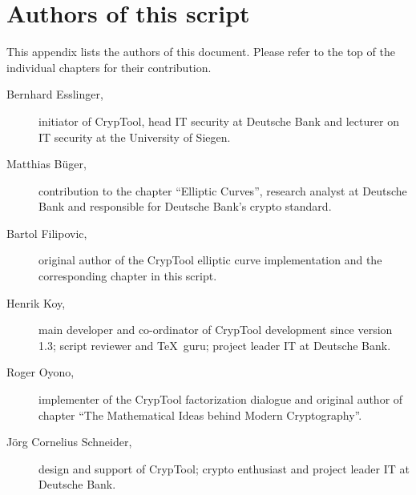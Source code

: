 \section{Authors of this script}
\hypertarget{appendix-authors}{}\label{s:appendix-authors}
This appendix lists the authors of this document. Please refer to the top of the individual
chapters for their contribution.

\begin{description}
\item[Bernhard Esslinger,] initiator of CrypTool, head IT security at Deutsche
Bank and lecturer on IT security at the University of Siegen.
 
\item[Matthias B\"uger,] contribution to the chapter ``Elliptic Curves'',
research analyst at Deutsche Bank and responsible for Deutsche Bank's
crypto standard.

\item[Bartol Filipovic,] original author of the CrypTool elliptic curve
implementation and the corresponding chapter in this script.

\item[Henrik Koy, ] main developer and co-ordinator of CrypTool development
since version 1.3; script reviewer and \TeX\ guru; project leader IT at
Deutsche Bank.

\item[Roger Oyono, ] implementer of the CrypTool factorization dialogue and
original author of chapter ``The Mathematical Ideas behind Modern
Cryptography''.

\item[J\"org Cornelius Schneider,] design and support of CrypTool; crypto
enthusiast and project leader IT at Deutsche Bank.

\end{description}

